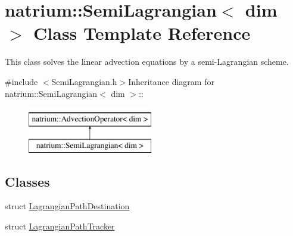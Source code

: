 \hypertarget{classnatrium_1_1SemiLagrangian}{
\section{natrium::SemiLagrangian$<$ dim $>$ Class Template Reference}
\label{classnatrium_1_1SemiLagrangian}
}


This class solves the linear advection equations by a semi-\/Lagrangian scheme.  


{\ttfamily \#include $<$SemiLagrangian.h$>$}Inheritance diagram for natrium::SemiLagrangian$<$ dim $>$::\begin{figure}[H]
\begin{center}
\leavevmode
\includegraphics[height=2cm]{classnatrium_1_1SemiLagrangian}
\end{center}
\end{figure}
\subsection*{Classes}
\begin{DoxyCompactItemize}
\item 
struct \hyperlink{structnatrium_1_1SemiLagrangian_1_1LagrangianPathDestination}{LagrangianPathDestination}
\item 
struct \hyperlink{structnatrium_1_1SemiLagrangian_1_1LagrangianPathTracker}{LagrangianPathTracker}
\end{DoxyCompactItemize}
